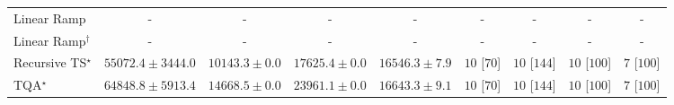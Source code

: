 \begin{tabular}{l|cccc|cccc|}
Linear Ramp & {\cellcolor[HTML]{000000}} \color[HTML]{F1F1F1} {\cellcolor{white}} \color{black} - & {\cellcolor[HTML]{000000}} \color[HTML]{F1F1F1} {\cellcolor{white}} \color{black} - & {\cellcolor[HTML]{000000}} \color[HTML]{F1F1F1} {\cellcolor{white}} \color{black} - & {\cellcolor[HTML]{000000}} \color[HTML]{F1F1F1} {\cellcolor{white}} \color{black} - & {\cellcolor[HTML]{000000}} \color[HTML]{F1F1F1} {\cellcolor{white}} \color{black} - & {\cellcolor[HTML]{000000}} \color[HTML]{F1F1F1} {\cellcolor{white}} \color{black} - & {\cellcolor[HTML]{000000}} \color[HTML]{F1F1F1} {\cellcolor{white}} \color{black} - & {\cellcolor[HTML]{000000}} \color[HTML]{F1F1F1} {\cellcolor{white}} \color{black} - \\
Linear Ramp$^\dagger$ & {\cellcolor[HTML]{000000}} \color[HTML]{F1F1F1} {\cellcolor{white}} \color{black} - & {\cellcolor[HTML]{000000}} \color[HTML]{F1F1F1} {\cellcolor{white}} \color{black} - & {\cellcolor[HTML]{000000}} \color[HTML]{F1F1F1} {\cellcolor{white}} \color{black} - & {\cellcolor[HTML]{000000}} \color[HTML]{F1F1F1} {\cellcolor{white}} \color{black} - & {\cellcolor[HTML]{000000}} \color[HTML]{F1F1F1} {\cellcolor{white}} \color{black} - & {\cellcolor[HTML]{000000}} \color[HTML]{F1F1F1} {\cellcolor{white}} \color{black} - & {\cellcolor[HTML]{000000}} \color[HTML]{F1F1F1} {\cellcolor{white}} \color{black} - & {\cellcolor[HTML]{000000}} \color[HTML]{F1F1F1} {\cellcolor{white}} \color{black} - \\
Recursive TS$^\star$ & {\cellcolor[HTML]{12763D}} \color[HTML]{F1F1F1} $55072.4\pm 3444.0$ & {\cellcolor[HTML]{FDFED9}} \color[HTML]{000000} $10143.3\pm 0.0$ & {\cellcolor[HTML]{EDF8B2}} \color[HTML]{000000} $17625.4\pm 0.0$ & {\cellcolor[HTML]{F2FAB5}} \color[HTML]{000000} $16546.3\pm 7.9$ & {\cellcolor[HTML]{49006A}} \color[HTML]{F1F1F1} $10$ [$70$] & {\cellcolor[HTML]{49006A}} \color[HTML]{F1F1F1} $10$ [$144$] & {\cellcolor[HTML]{49006A}} \color[HTML]{F1F1F1} $10$ [$100$] & {\cellcolor[HTML]{CD238F}} \color[HTML]{F1F1F1} $7$ [$100$] \\
TQA$^\star$ & {\cellcolor[HTML]{004A2B}} \color[HTML]{F1F1F1} $64848.8\pm 5913.4$ & {\cellcolor[HTML]{F8FCBD}} \color[HTML]{000000} $14668.5\pm 0.0$ & {\cellcolor[HTML]{D0EC9F}} \color[HTML]{000000} $23961.1\pm 0.0$ & {\cellcolor[HTML]{F2FAB5}} \color[HTML]{000000} $16643.3\pm 9.1$ & {\cellcolor[HTML]{49006A}} \color[HTML]{F1F1F1} $10$ [$70$] & {\cellcolor[HTML]{49006A}} \color[HTML]{F1F1F1} $10$ [$144$] & {\cellcolor[HTML]{49006A}} \color[HTML]{F1F1F1} $10$ [$100$] & {\cellcolor[HTML]{CD238F}} \color[HTML]{F1F1F1} $7$ [$100$] \\

\end{tabular}
